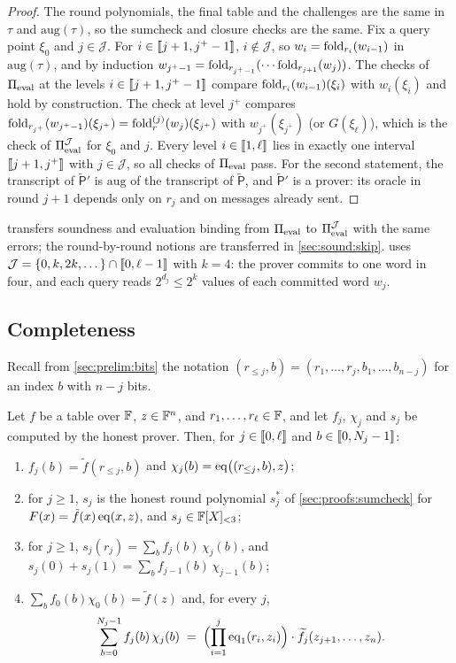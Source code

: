 \begin{proof}
The round polynomials, the final table and the challenges are the same in $\tau$ and $\mathrm{aug}(\tau)$, so the sumcheck and closure checks are the same.
Fix a query point $\xi_0$ and $j \in \mathcal{J}$. For $i \in \llbracket j+1, j^+ - 1 \rrbracket$, $i \notin \mathcal{J}$, so $w_i = \mathrm{fold}_{r_i}(w_{i-1})$ in $\mathrm{aug}(\tau)$, and by induction $w_{j^+ - 1} = \mathrm{fold}_{r_{j^+ - 1}}(\cdots\mathrm{fold}_{r_{j+1}}(w_j))$.
The checks of $\Pi_{\mathrm{eval}}$ at the levels $i \in \llbracket j+1, j^+ - 1 \rrbracket$ compare $\mathrm{fold}_{r_i}(w_{i-1})(\xi_i)$ with $w_i(\xi_i)$ and hold by construction.
The check at level $j^+$ compares $\mathrm{fold}_{r_{j^+}}(w_{j^+ - 1})(\xi_{j^+}) = \mathrm{fold}^{(j)}_r(w_j)(\xi_{j^+})$ with $w_{j^+}(\xi_{j^+})$ (or $G(\xi_\ell)$), which is the check of $\Pi_{\mathrm{eval}}^{\mathcal{J}}$ for $\xi_0$ and $j$.
Every level $i \in \llbracket 1, \ell \rrbracket$ lies in exactly one interval $\llbracket j+1, j^+ \rrbracket$ with $j \in \mathcal{J}$, so all checks of $\Pi_{\mathrm{eval}}$ pass.
For the second statement, the transcript of $\tilde{\mathsf{P}}'$ is $\mathrm{aug}$ of the transcript of $\tilde{\mathsf{P}}$, and $\tilde{\mathsf{P}}'$ is a prover: its oracle in round $j+1$ depends only on $r_j$ and on messages already sent.
\end{proof}

 transfers soundness and evaluation binding from $\Pi_{\mathrm{eval}}$ to $\Pi_{\mathrm{eval}}^{\mathcal{J}}$ with the same errors; the round-by-round notions are transferred in \cref{sec:sound:skip}.
 uses $\mathcal{J} = \{0, k, 2k, \dots\} \cap \llbracket 0, \ell-1 \rrbracket$ with $k = 4$: the prover commits to one word in four, and each query reads $2^{d_j} \le 2^k$ values of each committed word $w_j$.

\subsection{Completeness}\label{sec:pcs:complete}

Recall from \cref{sec:prelim:bits} the notation $(r_{\le j}, b) = (r_1,\dots,r_j,b_1,\dots,b_{n-j})$ for an index $b$ with $n-j$ bits.

\begin{lemma}\label{lem:honest}
Let $f$ be a table over $\mathbb{F}$, $z \in \mathbb{F}^n$, and $r_1,\dots,r_\ell \in \mathbb{F}$, and let $f_j$, $\chi_j$ and $s_j$ be computed by the honest prover. Then, for $j \in \llbracket 0, \ell \rrbracket$ and $b \in \llbracket 0, N_j-1 \rrbracket$:
\begin{enumerate}
  \item $f_j(b) = \tilde f(r_{\le j}, b)$ and $\chi_j(b) = \mathrm{eq}\bigl((r_{\le j}, b), z\bigr)$;
  \item for $j \ge 1$, $s_j$ is the honest round polynomial $s^*_j$ of \cref{sec:proofs:sumcheck} for $F(x) = \tilde f(x)\,\mathrm{eq}(x,z)$, and $s_j \in \mathbb{F}[X]_{<3}$;
  \item for $j \ge 1$, $s_j(r_j) = \sum_b f_j(b)\,\chi_j(b)$, and $s_j(0) + s_j(1) = \sum_b f_{j-1}(b)\,\chi_{j-1}(b)$;
  \item $\sum_b f_0(b)\chi_0(b) = \tilde f(z)$ and, for every $j$,
  \[
    \sum_{b=0}^{N_j-1} f_j(b)\,\chi_j(b) \;=\; \Bigl(\prod_{i=1}^{j}\mathrm{eq}_1(r_i,z_i)\Bigr)\cdot \widetilde{f_j}(z_{j+1},\dots,z_n).
  \]
\end{enumerate}
\end{lemma}

